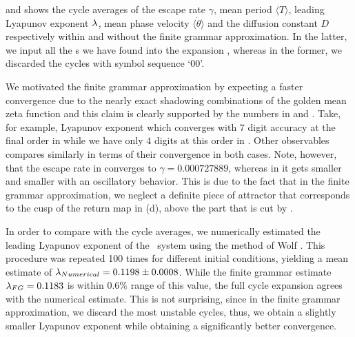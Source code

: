  and  shows
the cycle averages of the escape rate $\gamma$, mean period
$\langle T \rangle$, leading Lyapunov exponent $\lambda$, mean phase velocity
$\langle \dot{\theta} \rangle$ and the diffusion constant $D$ respectively
within and without the finite grammar approximation. In the latter, we input
all the \rpo s we have found into the expansion
, whereas in the former, we discarded the
cycles with symbol sequence `00'.




We motivated the finite grammar approximation by expecting a faster convergence
due to the nearly exact shadowing combinations of the golden mean zeta function
 and this claim is clearly supported by the
numbers in  and
. Take, for example, Lyapunov exponent
which converges with $7$ digit accuracy at the final order in
 while we have only $4$ digits at this order in
. Other observables compares similarly in
terms of their convergence in both cases. Note, however, that the escape rate
in  converges to $\gamma = 0.000727889$, whereas
in  it gets smaller and smaller with an
oscillatory behavior. This is due to the fact that in the finite grammar
approximation, we neglect a definite piece of attractor that corresponds to the
cusp of the return map in  (d), above the part that
is cut by .

In order to compare with the cycle averages, we numerically estimated the
leading Lyapunov exponent of the \twomode\ system using the method of
Wolf \etal{}. This procedure was repeated 100 times for
different initial conditions, yielding a mean estimate of
$\lambda_{Numerical} = 0.1198 \pm 0.0008$. While the finite grammar
estimate $\lambda_{FG} = 0.1183$ is within $0.6\%$ range of this value,
the full cycle expansion agrees with the numerical estimate. This is not
surprising, since in the finite grammar approximation, we discard the
most unstable cycles, thus, we obtain a slightly smaller Lyapunov
exponent while obtaining a significantly better convergence.
